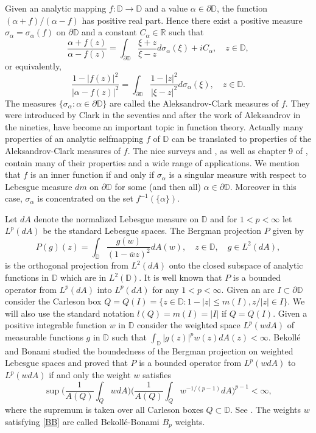 \documentclass[a4paper,12pt]{article}
\theoremstyle{definition}
\numberwithin{equation}{section}
\newcommand{\D}{\mathbb D}
\begin{document}
\medskip

Given an analytic mapping $f: \D \rightarrow \D$ and a value $\alpha \in \partial \D$, the function $(\alpha + f)/(\alpha - f)$ has positive real part. Hence there exist a positive measure $\sigma_\alpha = \sigma_\alpha (f)$ on $\partial \D$ and a constant $C_\alpha \in \mathbb{R}$ such that
\begin{equation}
    \label{AC}
    \frac{\alpha + f(z)}{\alpha - f(z)} = \int_{\partial \D} \frac{\xi + z}{\xi - z} d \sigma_\alpha (\xi) + i C_\alpha , \quad z \in \D,  
\end{equation}
or equivalently,   
\begin{equation}
    \label{AC11}
    \frac{1-|f(z)|^2}{|\alpha - f(z)|^2} = \int_{\partial \D} \frac{1-|z|^2}{|\xi - z|^2} d \sigma_\alpha (\xi), \quad z \in \D .
\end{equation}
The measures $\{\sigma_\alpha : \alpha \in \partial \D\}$ are called the Aleksandrov-Clark measures of $f$. They were introduced by Clark in the seventies and after the work of Aleksandrov in the nineties, have become an important topic in function theory. Actually many properties of an analytic selfmapping $f$ of $\D$ can be translated to properties of the Aleksandrov-Clark measures of $f. $ The nice surveys \cite{PolSar} and \cite{Saks}, as well as chapter 9 of \cite{cima}, contain many of their properties and a wide range of applications. We mention that $f$ is an inner function if and only if $\sigma_\alpha$ is a singular measure with respect to Lebesgue measure $dm$ on $\partial \D$ for some (and then all) $\alpha \in \partial \D$. Moreover in this case, $\sigma_\alpha$ is concentrated on the set $f^{-1} (\{\alpha \})$. 

Let $dA$ denote the normalized Lebesgue measure on $\D$ and for $1<p<\infty$ let $L^p (dA)$ be the standard Lebesgue spaces. The Bergman projection $P$ given by
$$
P (g) (z) = \int_{\D} \frac{g(w)}{(1- \overline{w}z)^2} d A(w), \quad z\in \D, \quad g \in L^2(dA), 
$$
is the orthogonal projection from $L^2(dA)$ onto the closed subspace of analytic functions in $\D$ which are in $L^2 (\D)$. It is well known that $P$ is a bounded operator from $L^p (dA)$ into $L^p (dA)$ for any $1<p<\infty$. Given an arc $I \subset \partial \D$ consider the Carleson box $Q= Q(I) =  \{z \in \D : 1-|z| \leq m(I), z/|z| \in I \}$. We will also use the standard notation $l(Q) = m(I)= |I|$ if $Q=Q(I)$. Given a positive integrable function $w$ in $\D$ consider the weighted space $L^p (w dA)$ of measurable functions $g$ in $\D$ such that $ \int_{\D} |g(z)|^p w(z) dA(z) < \infty $. Bekoll\'e and Bonami studied the boundedness of the Bergman projection on weighted Lebesgue spaces and proved that $P$ is a bounded operator from $L^p (w dA)$ to $L^p (w dA)$ if and only the weight $w$ satisfies
\begin{equation}
    \label{BB}
    \sup \bigg(\frac{1}{A(Q)} \int_Q w dA \bigg) \bigg( \frac{1}{A(Q)} \int_Q w^{-1/(p-1)} dA \bigg)^{p-1} < \infty , 
\end{equation}
where the supremum is taken over all Carleson boxes $Q \subset \D$. See \cite{BB}. The weights $w$ satisfying \eqref{BB} are called Bekoll\'e-Bonami $B_p$ weights.
\end{document}
